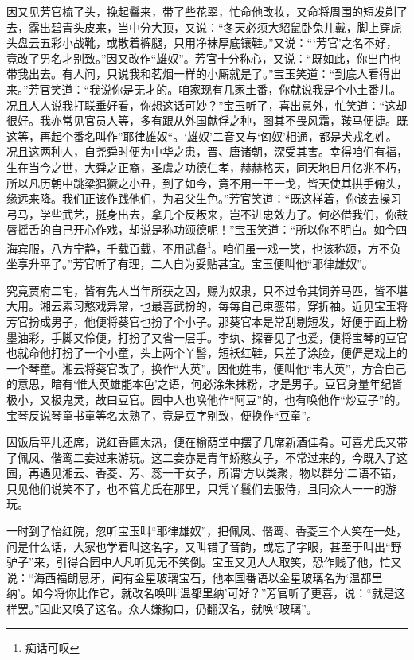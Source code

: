 \documentclass[12pt,oneside]{book}
\begin{document}
因又见芳官梳了头，挽起䰖来，带了些花翠，忙命他改妆，又命将周围的短发剃了去，露出碧青头皮来，当中分大顶，又说：“冬天必须大貂鼠卧兔儿戴，脚上穿虎头盘云五彩小战靴，或散着裤腿，只用净袜厚底镶鞋。”又说：“‘芳官’之名不好，竟改了男名才别致。”因又改作“雄奴”。芳官十分称心，又说：“既如此，你出门也带我出去。有人问，只说我和茗烟一样的小厮就是了。”宝玉笑道：“到底人看得出来。”芳官笑道：“我说你是无才的。咱家现有几家土番，你就说我是个小土番儿。况且人人说我打联垂好看，你想这话可妙？”宝玉听了，喜出意外，忙笑道：“这却很好。我亦常见官员人等，多有跟从外国献俘之种，图其不畏风霜，鞍马便捷。既这等，再起个番名叫作”耶律雄奴“。‘雄奴’二音又与‘匈奴’相通，都是犬戎名姓。况且这两种人，自尧舜时便为中华之患，晋、唐诸朝，深受其害。幸得咱们有福，生在当今之世，大舜之正裔，圣虞之功德仁孝，赫赫格天，同天地日月亿兆不朽，所以凡历朝中跳梁猖獗之小丑，到了如今，竟不用一干一戈，皆天使其拱手俯头，缘远来降。我们正该作践他们，为君父生色。”芳官笑道：“既这样着，你该去操习弓马，学些武艺，挺身出去，拿几个反叛来，岂不进忠效力了。何必借我们，你鼓唇摇舌的自己开心作戏，却说是称功颂德呢！”宝玉笑道：“所以你不明白。如今四海宾服，八方宁静，千载百载，不用武备\footnote{痴话可叹}。咱们虽一戏一笑，也该称颂，方不负坐享升平了。”芳官听了有理，二人自为妥贴甚宜。宝玉便叫他“耶律雄奴”。

究竟贾府二宅，皆有先人当年所获之囚，赐为奴隶，只不过令其饲养马匹，皆不堪大用。湘云素习憨戏异常，也最喜武扮的，每每自己束銮带，穿折袖。近见宝玉将芳官扮成男子，他便将葵官也扮了个小子。那葵官本是常刮剔短发，好便于面上粉墨油彩，手脚又伶便，打扮了又省一层手。李纨、探春见了也爱，便将宝琴的豆官也就命他打扮了一个小童，头上两个丫髻，短袄红鞋，只差了涂脸，便俨是戏上的一个琴童。湘云将葵官改了，换作“大英”。因他姓韦，便叫他“韦大英”，方合自己的意思，暗有‘惟大英雄能本色’之语，何必涂朱抹粉，才是男子。豆官身量年纪皆极小，又极鬼灵，故曰豆官。园中人也唤他作“阿豆”的，也有唤他作“炒豆子”的。宝琴反说琴童书童等名太熟了，竟是豆字别致，便换作“豆童”。

因饭后平儿还席，说红香圃太热，便在榆荫堂中摆了几席新酒佳肴。可喜尤氏又带了佩凤、偕鸾二妾过来游玩。这二妾亦是青年娇憨女子，不常过来的，今既入了这园，再遇见湘云、香菱、芳、蕊一干女子，所谓‘方以类聚，物以群分’二语不错，只见他们说笑不了，也不管尤氏在那里，只凭丫鬟们去服侍，且同众人一一的游玩。

一时到了怡红院，忽听宝玉叫“耶律雄奴”，把佩凤、偕鸾、香菱三个人笑在一处，问是什么话，大家也学着叫这名字，又叫错了音韵，或忘了字眼，甚至于叫出“野驴子”来，引得合园中人凡听见无不笑倒。宝玉又见人人取笑，恐作贱了他，忙又说：“海西福朗思牙，闻有金星玻璃宝石，他本国番语以金星玻璃名为‘温都里纳’。如今将你比作它，就改名唤叫‘温都里纳’可好？”芳官听了更喜，说：“就是这样罢。”因此又唤了这名。众人嫌拗口，仍翻汉名，就唤“玻璃”。
\end{document}
